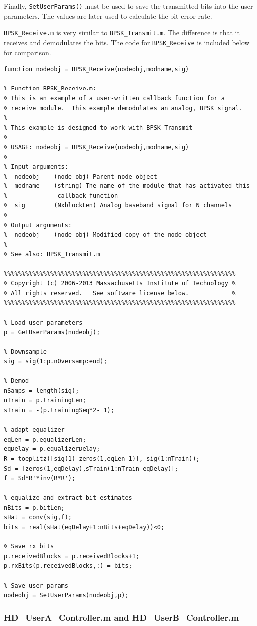 Finally, \verb+SetUserParams()+ must be used to save the transmitted
bits into the user parameters.  The values are later used to
calculate the bit error rate.

\verb+BPSK_Receive.m+ is very similar to \verb+BPSK_Transmit.m+. The
difference is that it receives and demodulates the bits.  The code
for \verb+BPSK_Receive+ is included below for comparison.

\begin{lstlisting}[name=bpskRx]
function nodeobj = BPSK_Receive(nodeobj,modname,sig)

% Function BPSK_Receive.m:
% This is an example of a user-written callback function for a 
% receive module.  This example demodulates an analog, BPSK signal.
%
% This example is designed to work with BPSK_Transmit
%
% USAGE: nodeobj = BPSK_Receive(nodeobj,modname,sig)
%
% Input arguments:
%  nodeobj    (node obj) Parent node object
%  modname    (string) The name of the module that has activated this
%              callback function
%  sig        (NxblockLen) Analog baseband signal for N channels
%
% Output arguments:
%  nodeobj    (node obj) Modified copy of the node object
%
% See also: BPSK_Transmit.m

%%%%%%%%%%%%%%%%%%%%%%%%%%%%%%%%%%%%%%%%%%%%%%%%%%%%%%%%%%%%%%%%%
% Copyright (c) 2006-2013 Massachusetts Institute of Technology %
% All rights reserved.   See software license below.            %
%%%%%%%%%%%%%%%%%%%%%%%%%%%%%%%%%%%%%%%%%%%%%%%%%%%%%%%%%%%%%%%%%

% Load user parameters
p = GetUserParams(nodeobj);

% Downsample
sig = sig(1:p.nOversamp:end);

% Demod
nSamps = length(sig);
nTrain = p.trainingLen;
sTrain = -(p.trainingSeq*2- 1);

% adapt equalizer
eqLen = p.equalizerLen;
eqDelay = p.equalizerDelay;
R = toeplitz([sig(1) zeros(1,eqLen-1)], sig(1:nTrain));
Sd = [zeros(1,eqDelay),sTrain(1:nTrain-eqDelay)];
f = Sd*R'*inv(R*R');

% equalize and extract bit estimates 
nBits = p.bitLen;
sHat = conv(sig,f);
bits = real(sHat(eqDelay+1:nBits+eqDelay))<0;

% Save rx bits
p.receivedBlocks = p.receivedBlocks+1;
p.rxBits(p.receivedBlocks,:) = bits;

% Save user params
nodeobj = SetUserParams(nodeobj,p);
\end{lstlisting}

\subsubsection{HD\_UserA\_Controller.m and HD\_UserB\_Controller.m}

